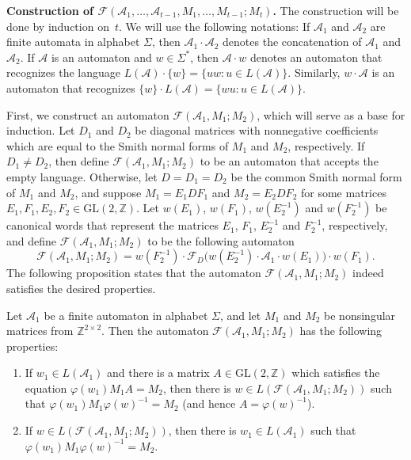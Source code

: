 \documentclass[fontsize=11pt,DIV=13,paper=letter]{scrartcl}
\theoremstyle{definition}
\newcommand{\A}{\mathcal{A}}
\newcommand{\Z}{\mathbb{Z}}
\newcommand{\F}{\mathcal{F}}
\newcommand{\GL}{\mathrm{GL}(2,\Z)}
\renewcommand{\phi}{\varphi}
\begin{document}
{\bf Construction of $\F(\A_1,\dots,\A_{t-1},M_1,\dots,M_{t-1};M_t)$.}
The construction will be done by induction on~$t$. We will use the following notations: If $\A_1$ and $\A_2$ are finite automata in alphabet $\Sigma$, then $\A_1\cdot \A_2$ denotes the concatenation of $\A_1$ and $\A_2$. If $\A$ is an automaton and $w\in \Sigma^*$, then $\A\cdot w$ denotes an automaton that recognizes the language $L(\A)\cdot \{w\} = \{uw: u\in L(\A)\}$. Similarly, $w\cdot \A$ is an automaton that recognizes $\{w\}\cdot L(\A) = \{wu: u\in L(\A)\}$.

First, we construct an automaton $\F(\A_1,M_1;M_2)$, which will serve as a base for induction. Let $D_1$ and $D_2$ be  diagonal matrices with nonnegative coefficients which are equal to the Smith normal forms of $M_1$ and $M_2$, respectively. If $D_1\neq D_2$, then define $\F(\A_1,M_1;M_2)$ to be an automaton that accepts the empty language. Otherwise, let $D=D_1=D_2$ be the common Smith normal form of $M_1$ and $M_2$, and suppose $M_1=E_1DF_1$ and $M_2=E_2DF_2$ for some matrices $E_1,F_1,E_2,F_2\in \GL$. Let $w(E_1)$, $w(F_1)$, $w(E_2^{-1})$ and $w(F_2^{-1})$ be canonical words that represent the matrices $E_1$, $F_1$, $E_2^{-1}$ and $F_2^{-1}$, respectively, and define $\F(\A_1,M_1;M_2)$ to be the following automaton
\[
\F(\A_1,M_1;M_2) = w(F_2^{-1})\cdot \F_D\big(w(E_2^{-1})\cdot \A_1\cdot w(E_1)\big)\cdot w(F_1).
\]
The following proposition states that the automaton $\F(\A_1,M_1;M_2)$ indeed satisfies the desired properties.

\begin{proposition} \label{prop:aut1}
Let $\A_1$ be a finite automaton in alphabet $\Sigma$, and let $M_1$ and $M_2$ be nonsingular matrices from $\Z^{2\times 2}$. Then the automaton $\F(\A_1,M_1;M_2)$ has the following properties:
\begin{enumerate}[(1)]
\item If $w_1\in L(\A_1)$ and there is a matrix $A\in \GL$ which satisfies the equation $\phi(w_1)M_1A=M_2$, then there is $w\in L(\F(\A_1,M_1;M_2))$ such that $\phi(w_1)M_1\phi(w)^{-1}=M_2$ (and hence $A=\phi(w)^{-1}$).

\item If $w\in L(\F(\A_1,M_1;M_2))$, then there is $w_1\in L(\A_1)$ such that $\phi(w_1)M_1\phi(w)^{-1}=M_2$.
\end{enumerate}
\end{proposition}
\end{document}
